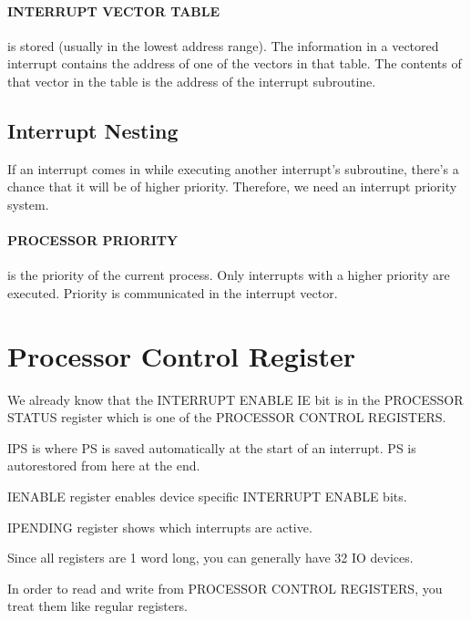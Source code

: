 \documentclass[a4paper,12pt]{report}
\begin{document}
\paragraph{INTERRUPT VECTOR TABLE } is stored (usually in the lowest address range). The information in a vectored interrupt contains the 
address of one of the vectors in that table. The contents of that vector in the table is the address of the interrupt subroutine.

\subsection{Interrupt Nesting}
If an interrupt comes in while executing another interrupt's subroutine, there's a chance that it will be of higher priority. Therefore, 
we need an interrupt priority system.

\paragraph{PROCESSOR PRIORITY } is the priority of the current process. Only interrupts with a higher priority are executed. Priority is
communicated in the interrupt vector. 

\section{Processor Control Register}
We already know that the INTERRUPT ENABLE IE bit is in the PROCESSOR STATUS register which is one of the PROCESSOR CONTROL REGISTERS.

IPS is where PS is saved automatically at the start of an interrupt. PS is autorestored from here at the end.

IENABLE register enables device specific INTERRUPT ENABLE bits. 

IPENDING register shows which interrupts are active. 

Since all registers are 1 word long, you can generally have 32 IO devices. 

In order to read and write from PROCESSOR CONTROL REGISTERS, you treat them like regular registers. 
\end{document}
